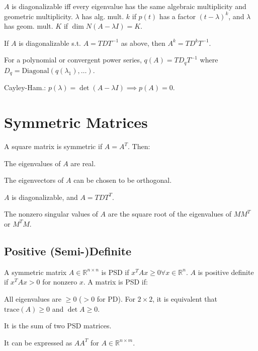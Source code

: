 \documentclass[10pt]{extarticle}
\begin{document}
\begin{multicols*}{2}
$A$ is diagonalizable iff every eigenvalue has the same algebraic multiplicity and geometric multiplicity. $\lambda$ has alg. mult. $k$ if $p(t)$ has a factor $(t-\lambda)^k$, and $\lambda$ has geom. mult. $K$ if $\dim N(A - \lambda I) = K$.

\begin{compactitem}
\item If $A$ is diagonalizable s.t. $A = TDT^{-1}$ as above, then $A^k = TD^kT^{-1}$.
\item For a polynomial or convergent power series, $q(A) = TD_qT^{-1}$ where $D_q = \text{Diagonal}(q(\lambda_1), \ldots)$.
\item Cayley-Ham.: $p(\lambda) = \det (A - \lambda I) \implies p(A) = 0$.
\end{compactitem}

\section{Symmetric Matrices}
A square matrix is symmetric if $A = A^T$. Then:

\begin{compactitem}
\item The eigenvalues of $A$ are real.
\item The eigenvectors of $A$ can be chosen to be orthogonal.
\item $A$ is diagonalizable, and $A = TDT^T$.
\item The nonzero singular values of $A$ are the square root of the eigenvalues of $MM^T$ or $M^T M$.
\end{compactitem}

\subsection{Positive (Semi-)Definite}
A symmetric matrix $A \in \mathbb{R}^{n \times n}$ is PSD if $x^T A x \geq 0 \forall x \in \mathbb{R}^n$. $A$ is positive definite if $x^T A x > 0$ for nonzero $x$. A matrix is PSD if:

\begin{compactitem}
	\item All eigenvalues are $\geq 0$ ($> 0$ for PD). For $2\times 2$, it is equivalent that $\text{trace}(A) \geq 0$ and $\det A \geq 0$.	
	\item It is the sum of two PSD matrices.
	\item It can be expressed as $AA^T$ for $A \in \mathbb{R}^{n \times m}$.
\end{compactitem}



\end{multicols*}
\end{document}
